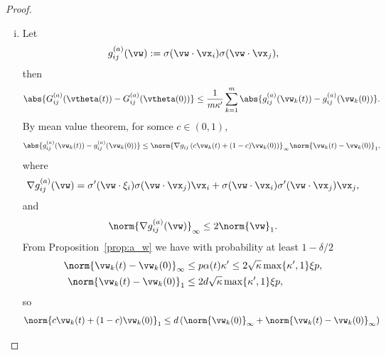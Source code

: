 \documentclass{article}
\begin{document}
\begin{proof}
\begin{enumerate}[(a)]
              \begin{enumerate}[(i)]
                  \item Let
                        \begin{equation}
                            g^{(a)}_{ij}(\vw) := \sigma(\vw\cdot\vx_i)\sigma(\vw\cdot\vx_j),
                        \end{equation}
                        then
                        \begin{equation}
                            \abs{G_{ij}^{(a)}(\vtheta(t)) - G_{ij}^{(a)}(\vtheta(0))} \leq \frac{1}{m\kappa'}\sum_{k=1}^m \abs{g^{(a)}_{ij}(\vw_k(t)) - g^{(a)}_{ij}(\vw_k(0))}.
                        \end{equation}
                        By mean value theorem, for somce $c\in(0,1)$,
                        \begin{equation}
                            \abs{g^{(a)}_{ij}(\vw_k(t)) - g^{(a)}_{ij}(\vw_k(0))} \leq \norm{\nabla g_{ij}\left(c\vw_k(t) + (1-c)\vw_k(0)\right)}_{\infty}\norm{\vw_k(t) - \vw_k(0)}_1,
                        \end{equation}
                        where
                        \begin{equation}
                            \nabla g_{ij}^{(a)}(\vw)=\sigma'(\vw\cdot\xi_i)\sigma(\vw\cdot\vx_j)\vx_i+\sigma(\vw\cdot\vx_i)\sigma'(\vw\cdot\vx_j)\vx_j,
                        \end{equation}
                        and
                        \begin{equation}
                            \norm{\nabla g_{ij}^{(a)}(\vw)}_{\infty}\leq 2\norm{\vw}_1.
                        \end{equation}
                        From Proposition~\ref{prop:a_w} we have with probability at least $1-\delta/2$
                        \begin{align}
                            \norm{\vw_k(t)-\vw_k(0)}_{\infty} & \leq p\alpha(t)\kappa'\leq 2\sqrt{\kappa}\max\{\kappa',1\}\xi p, \\
                            \norm{\vw_k(t)-\vw_k(0)}_1        & \leq 2d\sqrt{\kappa}\max\{\kappa',1\}\xi p,
                        \end{align}
                        so
                        \begin{equation}
                            \begin{aligned}
                                \norm{c\vw_k(t) + (1-c)\vw_k(0)}_1
                                 & \leq d\left(\norm{\vw_k(0)}_{\infty} + \norm{\vw_k(t) - \vw_k(0)}_{\infty}\right) \\

\end{aligned}
\end{equation}
\end{enumerate}
\end{enumerate}
\end{proof}
\end{document}
